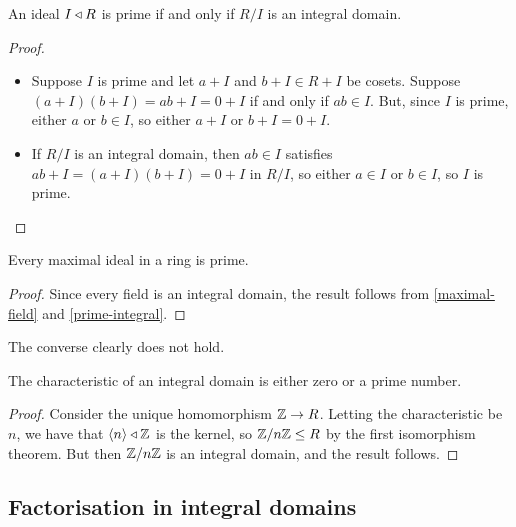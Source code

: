\documentclass{../../template/note}
\begin{document}
    \begin{proposition}
        \label{prime-integral}
        An ideal $I \triangleleft R$ is prime if and only if $R/I$ is an integral domain.
    \end{proposition}
    
    \begin{proof}\
        \begin{itemize}
            \item[$\implies$] Suppose $I$ is prime and let $a + I$ and $b + I \in R + I$ be cosets. Suppose $(a + I)(b + I) = ab + I = 0 + I$ if and only if $ab \in I$. But, since $I$ is prime, either $a$ or $b \in I$, so either $a + I$ or $b + I = 0 + I$.
            \item[$\impliedby$] If $R/I$ is an integral domain, then $ab \in I$ satisfies $ab + I = (a + I)(b + I) = 0 + I$ in $R/I$, so either $a \in I$ or $b \in I$, so $I$ is prime.
        \end{itemize}
    \end{proof}
    
    \begin{corollary}
        Every maximal ideal in a ring is prime.
    \end{corollary}
    
    \begin{proof}
        Since every field is an integral domain, the result follows from \cref{maximal-field} and \cref{prime-integral}.
    \end{proof}
    
    \begin{remark*}
        The converse clearly does not hold.
    \end{remark*}
    
    \begin{proposition}
        The characteristic of an integral domain is either zero or a prime number.
    \end{proposition}
    
    \begin{proof}
        Consider the unique homomorphism $\mathbb Z \to R$. Letting the characteristic be $n$, we have that $\left \langle n \right \rangle \triangleleft \mathbb Z$ is the kernel, so $\mathbb Z/n\mathbb Z \leq R$ by the first isomorphism theorem. But then $\mathbb Z/n\mathbb Z$ is an integral domain, and the result follows.
    \end{proof}
    
    \subsection{Factorisation in integral domains}
\end{document}
